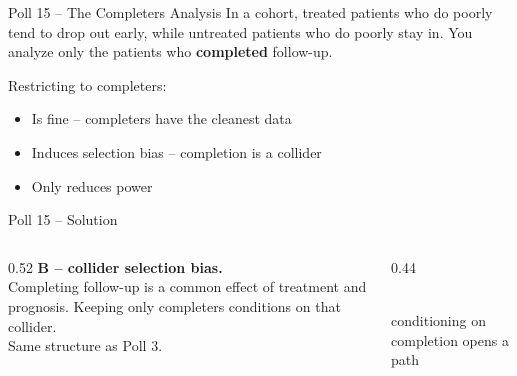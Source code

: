 \documentclass[aspectratio=169]{beamer}
\begin{document}
\begin{frame}{Poll 15 \;--\; The Completers Analysis}
  \small
  In a cohort, treated patients who do poorly tend to drop out early, while
  untreated patients who do poorly stay in. You analyze only the patients who
  \textbf{completed} follow-up.
  \vspace{0.8em}

  Restricting to completers:
  \begin{itemize}
    \item[\textbf{A.}] Is fine -- completers have the cleanest data
    \item[\textbf{B.}] Induces selection bias -- completion is a collider
    \item[\textbf{C.}] Only reduces power
  \end{itemize}
\end{frame}

\begin{frame}{Poll 15 \;--\; Solution}
  \small
  \begin{columns}[T]
    \begin{column}{0.52\textwidth}
      \textcolor{good}{\textbf{B -- collider selection bias.}}\\[0.4em]
      Completing follow-up is a common effect of treatment and prognosis.
      Keeping only completers conditions on that collider.\\[0.3em]
      \textcolor{brick}{Same structure as Poll 3.}
    \end{column}
    \begin{column}{0.44\textwidth}
      \centering
      \\[0.3em]
      {\scriptsize conditioning on completion opens a path}
    \end{column}
  \end{columns}
\end{frame}
\end{document}
